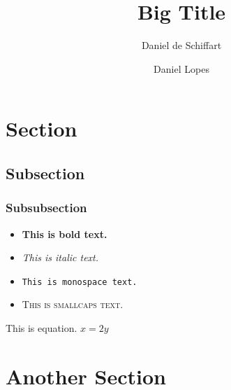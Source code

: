 \documentclass[palatino,english,twoside]{ist-report}
\begin{document}
\pagestyle{style1}

\title{Big Title}
\author{Daniel de Schiffart \and Daniel Lopes}
\makecover{}

\section{Section}

\lipsum[1]

\subsection{Subsection}

\lipsum[1-2]

\subsubsection{Subsubsection}

\begin{itemize}
	\item \textbf{This is bold text.}
	\item \textit{This is italic text.}
	\item \texttt{This is monospace text.}
	\item \textsc{This is smallcaps text.}
\end{itemize}

This is equation. $x = 2y$

\section{Another Section}

\lipsum[1-80]
\end{document}
